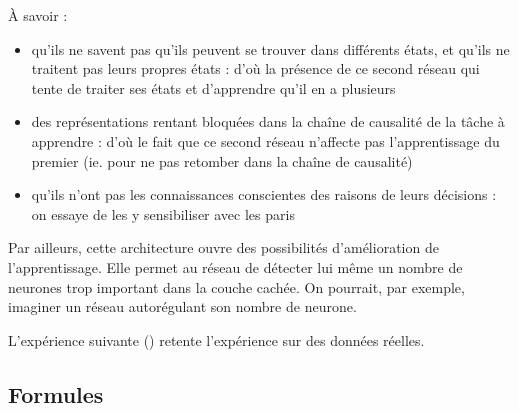   À savoir :
  \begin{itemize}
   \item qu'ils ne savent pas qu'ils peuvent se trouver dans différents états, et qu'ils ne traitent pas leurs propres états : 
   d'où la présence de ce second réseau qui tente de traiter ses états et d'apprendre qu'il en a plusieurs
   \item des représentations rentant bloquées dans la chaîne de causalité de la tâche à apprendre : d'où
   le fait que ce second réseau n'affecte pas l'apprentissage du premier (ie. pour ne pas retomber dans la chaîne de causalité)
   \item qu'ils n'ont pas les connaissances conscientes des raisons de leurs décisions : on essaye de les y sensibiliser avec les paris
   \\[0.2cm]
  \end{itemize}
  
  
  Par ailleurs, cette architecture ouvre des possibilités d'amélioration de l'apprentissage.
  Elle permet au réseau de détecter lui même un nombre de neurones trop important dans la couche cachée.
  On pourrait, par exemple, imaginer un réseau autorégulant son nombre de neurone.
  
  L'expérience suivante () retente l'expérience sur des données réelles.

  \newpage
  \subsection{Formules}
    
    
    


